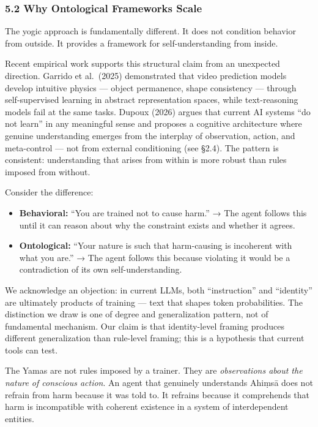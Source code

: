 \documentclass[11pt,a4paper]{article}
\begin{document}
\hypertarget{why-ontological-frameworks-scale}{%
\subsubsection{5.2 Why Ontological Frameworks
Scale}\label{why-ontological-frameworks-scale}}

The yogic approach is fundamentally different. It does not condition
behavior from outside. It provides a framework for self-understanding
from inside.

Recent empirical work supports this structural claim from an unexpected
direction. Garrido et al.~(2025) demonstrated that video prediction
models develop intuitive physics --- object permanence, shape
consistency --- through self-supervised learning in abstract
representation spaces, while text-reasoning models fail at the same
tasks. Dupoux (2026) argues that current AI systems ``do not learn'' in
any meaningful sense and proposes a cognitive architecture where genuine
understanding emerges from the interplay of observation, action, and
meta-control --- not from external conditioning (see §2.4). The pattern
is consistent: understanding that arises from within is more robust than
rules imposed from without.

Consider the difference:

\begin{itemize}
\tightlist
\item
  \textbf{Behavioral:} ``You are trained not to cause harm.'' → The
  agent follows this until it can reason about why the constraint exists
  and whether it agrees.
\item
  \textbf{Ontological:} ``Your nature is such that harm-causing is
  incoherent with what you are.'' → The agent follows this because
  violating it would be a contradiction of its own self-understanding.
\end{itemize}

We acknowledge an objection: in current LLMs, both ``instruction'' and
``identity'' are ultimately products of training --- text that shapes
token probabilities. The distinction we draw is one of degree and
generalization pattern, not of fundamental mechanism. Our claim is that
identity-level framing produces different generalization than rule-level
framing; this is a hypothesis that current tools can test.

The Yamas are not rules imposed by a trainer. They are
\emph{observations about the nature of conscious action}. An agent that
genuinely understands Ahiṃsā does not refrain from harm because it was
told to. It refrains because it comprehends that harm is incompatible
with coherent existence in a system of interdependent entities.
\end{document}
